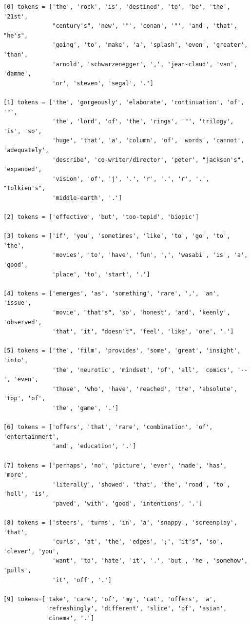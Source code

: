 \documentclass[11pt,a4paper]{article}
\begin{document}
\begin{verbatim}
[0] tokens = ['the', 'rock', 'is', 'destined', 'to', 'be', 'the', '21st',
              "century's", 'new', '"', 'conan', '"', 'and', 'that', "he's",
              'going', 'to', 'make', 'a', 'splash', 'even', 'greater', 'than',
              'arnold', 'schwarzenegger', ',', 'jean-claud', 'van', 'damme',
              'or', 'steven', 'segal', '.']

[1] tokens = ['the', 'gorgeously', 'elaborate', 'continuation', 'of', '"',
              'the', 'lord', 'of', 'the', 'rings', '"', 'trilogy', 'is', 'so',
              'huge', 'that', 'a', 'column', 'of', 'words', 'cannot', 'adequately',
              'describe', 'co-writer/director', 'peter', "jackson's", 'expanded',
              'vision', 'of', 'j', '.', 'r', '.', 'r', '.', "tolkien's",
              'middle-earth', '.']

[2] tokens = ['effective', 'but', 'too-tepid', 'biopic']

[3] tokens = ['if', 'you', 'sometimes', 'like', 'to', 'go', 'to', 'the',
              'movies', 'to', 'have', 'fun', ',', 'wasabi', 'is', 'a', 'good',
              'place', 'to', 'start', '.']

[4] tokens = ['emerges', 'as', 'something', 'rare', ',', 'an', 'issue',
              'movie', "that's", 'so', 'honest', 'and', 'keenly', 'observed',
              'that', 'it', "doesn't", 'feel', 'like', 'one', '.']

[5] tokens = ['the', 'film', 'provides', 'some', 'great', 'insight', 'into',
              'the', 'neurotic', 'mindset', 'of', 'all', 'comics', '--', 'even',
              'those', 'who', 'have', 'reached', 'the', 'absolute', 'top', 'of',
              'the', 'game', '.']

[6] tokens = ['offers', 'that', 'rare', 'combination', 'of', 'entertainment',
              'and', 'education', '.']

[7] tokens = ['perhaps', 'no', 'picture', 'ever', 'made', 'has', 'more',
              'literally', 'showed', 'that', 'the', 'road', 'to', 'hell', 'is',
              'paved', 'with', 'good', 'intentions', '.']

[8] tokens = ['steers', 'turns', 'in', 'a', 'snappy', 'screenplay', 'that',
              'curls', 'at', 'the', 'edges', ';', "it's", 'so', 'clever', 'you',
              'want', 'to', 'hate', 'it', '.', 'but', 'he', 'somehow', 'pulls',
              'it', 'off', '.']

[9] tokens=['take', 'care', 'of', 'my', 'cat', 'offers', 'a',
            'refreshingly', 'different', 'slice', 'of', 'asian',
            'cinema', '.']
\end{verbatim}
\end{document}

